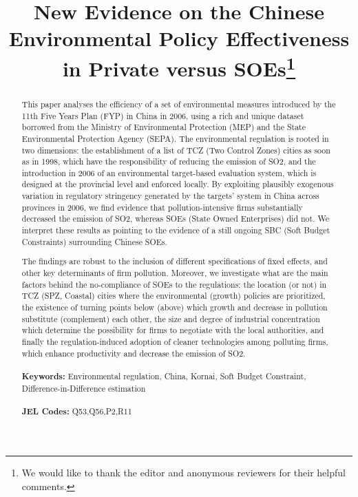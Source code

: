 \documentclass[12pt]{article}
\begin{document}
\begin{titlepage}


\title{New Evidence on the Chinese Environmental Policy Effectiveness in Private versus SOEs\thanks{We would like to thank the editor and anonymous reviewers for their helpful comments.}}
\author{}


\date{}

\maketitle
\begin{abstract}
\noindent This paper analyses the efficiency of a set of environmental measures introduced by the 11th Five Years Plan (FYP) in China in 2006, using a rich and unique dataset borrowed from the Ministry of Environmental Protection (MEP) and the State Environmental Protection Agency (SEPA). The environmental regulation is rooted in two dimensions: the establishment of a list of TCZ (Two Control Zones) cities as soon as in 1998, which have the responsibility of reducing the emission of SO2, and the introduction in 2006 of an environmental target-based evaluation system, which is designed at the provincial level and enforced locally. By exploiting plausibly exogenous variation in regulatory stringency generated by the targets' system in China across provinces in 2006, we find evidence that pollution-intensive firms substantially decreased the emission of SO2, whereas SOEs (State Owned Enterprises) did not. We interpret these results as pointing to the evidence of a still ongoing SBC (Soft Budget Constraints) surrounding Chinese SOEs. 

The findings are robust to the inclusion of different specifications of fixed effects, and other key determinants of firm pollution. Moreover, we investigate what are the main factors behind the no-compliance of SOEs to the regulations: the location (or not) in TCZ (SPZ, Coastal) cities where the environmental (growth) policies are prioritized, the existence of turning points below (above) which growth and decrease in pollution substitute (complement) each other, the size and degree of industrial concentration which determine the possibility for firms to negotiate with the local authorities, and finally the regulation-induced adoption of cleaner technologies among polluting firms, which enhance productivity and decrease the emission of SO2.  \\
\vspace{0em}\\
\noindent\textbf{Keywords:} Environmental regulation, China, Kornai, Soft Budget Constraint, Difference-in-Difference estimation\\
\vspace{0em}\\
\noindent\textbf{JEL Codes:} Q53,Q56,P2,R11
\\
\bigskip
\end{abstract}
\setcounter{page}{0}
\thispagestyle{empty}
\end{titlepage}
\pagebreak \newpage
\end{document}
